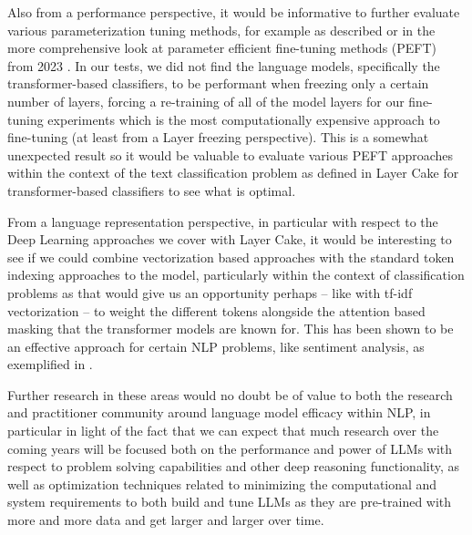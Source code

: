 \documentclass[final]{clv2025}
\begin{document}
Also from a performance perspective, it would be informative to further evaluate various parameterization tuning methods, for example as described \cite{lee} or in the more comprehensive look at parameter efficient fine-tuning methods (PEFT) from 2023 \cite{articleding}. In our tests, we did not find the language models, specifically the transformer-based classifiers, to be performant when freezing only a certain number of layers, forcing a re-training of all of the model layers for our fine-tuning experiments which is the most computationally expensive approach to fine-tuning (at least from a Layer freezing perspective). This is a somewhat unexpected result so it would be valuable to evaluate various PEFT approaches within the context of the text classification problem as defined in Layer Cake for transformer-based classifiers to see what is optimal. 

From a language representation perspective, in particular with respect to the Deep Learning approaches we cover with Layer Cake, it would be interesting to see if we could combine vectorization based approaches with the standard token indexing approaches to the model, particularly within the context of classification problems as that would give us an opportunity perhaps – like with tf-idf vectorization – to weight the different tokens alongside the attention based masking that the transformer models are known for. This has been shown to be an effective approach for certain NLP problems, like sentiment analysis, as exemplified in \cite{liang2022research} \cite{zhao2022research} \cite{kamyab2021attention}.

Further research in these areas would no doubt be of value to both the research and practitioner community around language model efficacy within NLP, in particular in light of the fact that we can expect that much research over the coming years will be focused both on the performance and power of LLMs with respect to problem solving capabilities and other deep reasoning functionality, as well as optimization techniques related to minimizing the computational and system requirements to both build and tune LLMs as they are pre-trained with more and more data and get larger and larger over time.







\newpage



\end{document}
